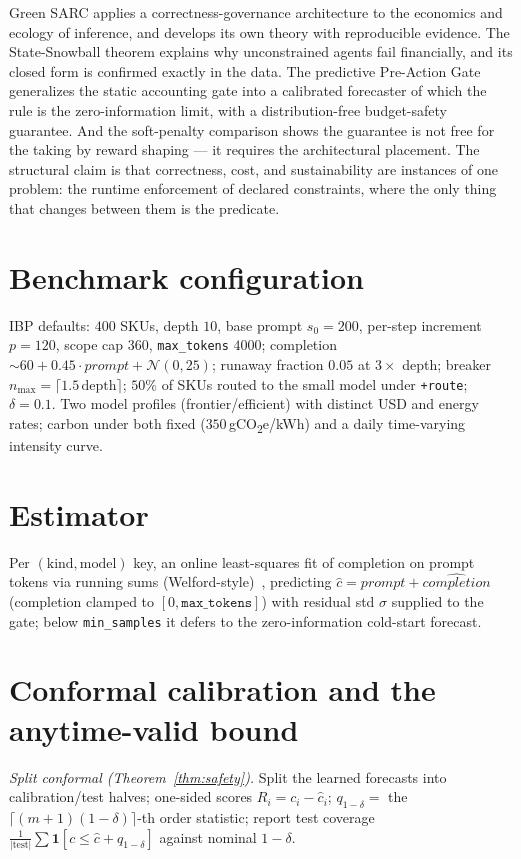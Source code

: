 \documentclass[11pt]{article}
\theoremstyle{plain}
\theoremstyle{definition}
\theoremstyle{remark}
\begin{document}
Green SARC applies a correctness-governance architecture to the economics and ecology of inference, and develops its own theory with reproducible evidence. The State-Snowball theorem explains why unconstrained agents fail financially, and its closed form is confirmed exactly in the data. The predictive Pre-Action Gate generalizes the static accounting gate into a calibrated forecaster of which the rule is the zero-information limit, with a distribution-free budget-safety guarantee. And the soft-penalty comparison shows the guarantee is not free for the taking by reward shaping --- it requires the architectural placement. The structural claim is that correctness, cost, and sustainability are instances of one problem: the runtime enforcement of declared constraints, where the only thing that changes between them is the predicate.

\appendix
\section{Benchmark configuration}\label{app:config}
IBP defaults: $400$ SKUs, depth $10$, base prompt $s_0=200$, per-step increment $p=120$, scope cap $360$, \texttt{max\_tokens} $4000$; completion $\sim 60 + 0.45\cdot prompt + \mathcal N(0,25)$; runaway fraction $0.05$ at $3\times$ depth; breaker $n_{\max}=\lceil 1.5\,\text{depth}\rceil$; $50\%$ of SKUs routed to the small model under \texttt{+route}; $\delta=0.1$. Two model profiles (frontier/efficient) with distinct USD and energy rates; carbon under both fixed ($350$\,gCO\textsubscript{2}e/kWh) and a daily time-varying intensity curve.

\section{Estimator}\label{app:estimator}
Per $(\text{kind},\text{model})$ key, an online least-squares fit of completion on prompt tokens via running sums (Welford-style)~\cite{welford1962}, predicting $\hat c = prompt + \widehat{completion}$ (completion clamped to $[0,\texttt{max\_tokens}]$) with residual std $\sigma$ supplied to the gate; below \texttt{min\_samples} it defers to the zero-information cold-start forecast.

\section{Conformal calibration and the anytime-valid bound}\label{app:conformal}
\emph{Split conformal (Theorem~\ref{thm:safety}).} Split the learned forecasts into calibration/test halves; one-sided scores $R_i=c_i-\hat c_i$; $q_{1-\delta}=$ the $\lceil (m+1)(1-\delta)\rceil$-th order statistic; report test coverage $\frac1{|\text{test}|}\sum \mathbf 1[c\le \hat c + q_{1-\delta}]$ against nominal $1-\delta$.
\end{document}

